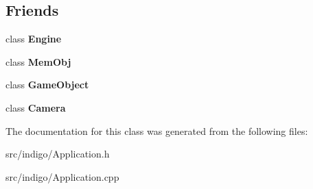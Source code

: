 \subsection*{Friends}
\begin{DoxyCompactItemize}
\item 
\mbox{\label{class_indigo_1_1_application_a3e1914489e4bed4f9f23cdeab34a43dc}} 
class {\bfseries Engine}
\item 
\mbox{\label{class_indigo_1_1_application_a5b789837fad8c88af8443fc6aa839c75}} 
class {\bfseries Mem\+Obj}
\item 
\mbox{\label{class_indigo_1_1_application_a00df87c957d8f7ee0fc51f07a0542f4a}} 
class {\bfseries Game\+Object}
\item 
\mbox{\label{class_indigo_1_1_application_ad8bd9afbbd7af19d996da80e9d25890d}} 
class {\bfseries Camera}
\end{DoxyCompactItemize}


The documentation for this class was generated from the following files\+:\begin{DoxyCompactItemize}
\item 
src/indigo/Application.\+h\item 
src/indigo/Application.\+cpp\end{DoxyCompactItemize}
